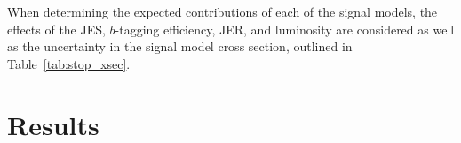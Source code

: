 \begin{table}[ht]
\caption{Summary of the effect of each considered sources of systematic
  uncertainty in the background estimate in SR~400 and SR~600. Several
  sources of theoretical systematic uncertainty which have a small
  effect on the total background estimate are grouped into the
  ``Other theory'' category.
  If the uncertainty is asymmetric, the larger deviation is reported in this
  table.
  {\color{red} TODO update this table with broken down info and CRs.}
}
\label{tab:systematic_breakdown}
%
\end{table}

When determining the expected contributions of each of the signal models,
the effects of the JES, $b$-tagging efficiency, JER, and luminosity are
considered as well as the uncertainty in the signal model cross section,
outlined in Table~\ref{tab:stop_xsec}.

\chapter[Results][Results]{Results}
\label{ch:results}

